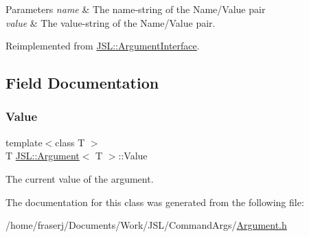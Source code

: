 \begin{DoxyParams}{Parameters}
{\em name} & The name-\/string of the Name/\+Value pair\\
\hline
{\em value} & The value-\/string of the Name/\+Value pair. \\
\hline
\end{DoxyParams}


Reimplemented from \hyperlink{classJSL_1_1ArgumentInterface_a28b487f7a4fa6e721ed6629abe2073f2}{J\+S\+L\+::\+Argument\+Interface}.



\subsection{Field Documentation}
\mbox{\label{classJSL_1_1Argument_a83ada5bfa412192f76dd4290f679defd}} 
\subsubsection{\texorpdfstring{Value}{Value}}
{\footnotesize\ttfamily template$<$class T $>$ \\
T \hyperlink{classJSL_1_1Argument}{J\+S\+L\+::\+Argument}$<$ T $>$\+::Value}



The current value of the argument. 



The documentation for this class was generated from the following file\+:\begin{DoxyCompactItemize}
\item 
/home/fraserj/\+Documents/\+Work/\+J\+S\+L/\+Command\+Args/\hyperlink{Argument_8h}{Argument.\+h}\end{DoxyCompactItemize}
